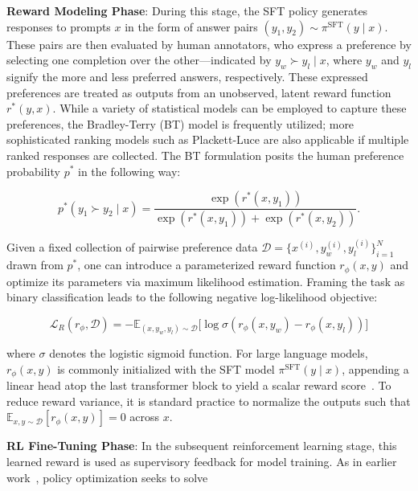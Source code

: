 \textbf{Reward Modeling Phase}: During this stage, the SFT policy generates responses to prompts $x$ in the form of answer pairs $(y_1, y_2)\sim \pi^\text{SFT}(y \mid x)$. These pairs are then evaluated by human annotators, who express a preference by selecting one completion over the other—indicated by $y_w\succ y_l \mid x$, where $y_w$ and $y_l$ signify the more and less preferred answers, respectively. These expressed preferences are treated as outputs from an unobserved, latent reward function $r^*(y, x)$. While a variety of statistical models can be employed to capture these preferences, the Bradley-Terry (BT) model \cite{bradley1952rankanalysis} is frequently utilized; more sophisticated ranking models such as Plackett-Luce \citep{plackett1975analysis, luce2012individual} are also applicable if multiple ranked responses are collected. The BT formulation posits the human preference probability $p^*$ in the following way:

\begin{equation}\label{eq:bradley-terry}
    p^*(y_1\succ y_2 \mid x)=\frac{\exp\left(r^*(x, y_1)\right)}{\exp\left(r^*(x, y_1)\right) + \exp\left(r^*(x, y_2)\right)}.
\end{equation}

Given a fixed collection of pairwise preference data $\mathcal{D}=\bigl\{x^{(i)}, y_w^{(i)}, y_l^{(i)}\bigr\}_{i=1}^N$ drawn from $p^*$, one can introduce a parameterized reward function $r_{\phi}(x, y)$ and optimize its parameters via maximum likelihood estimation. Framing the task as binary classification leads to the following negative log-likelihood objective:

\begin{equation}\label{eq:reward_model}
    \mathcal{L}_R(r_{\phi}, \mathcal{D}) = -\mathbb{E}_{(x, y_w, y_l)\sim \mathcal{D}}\bigl[\log \sigma(r_{\phi}(x, y_w)- r_{\phi}(x, y_l))\bigr]
\end{equation}

where $\sigma$ denotes the logistic sigmoid function. For large language models, $r_{\phi}(x, y)$ is commonly initialized with the SFT model $\pi^\text{SFT}(y \mid x)$, appending a linear head atop the last transformer block to yield a scalar reward score~\cite{ziegler2020finetuning}. To reduce reward variance, it is standard practice to normalize the outputs such that $\mathbb{E}_{x,y\sim \mathcal{D}}\left[r_\phi(x, y)\right] = 0$ across $x$.

\textbf{RL Fine-Tuning Phase}: In the subsequent reinforcement learning stage, this learned reward is used as supervisory feedback for model training. As in earlier work~\citep{jaques2017sequence, jaques2020human}, policy optimization seeks to solve

